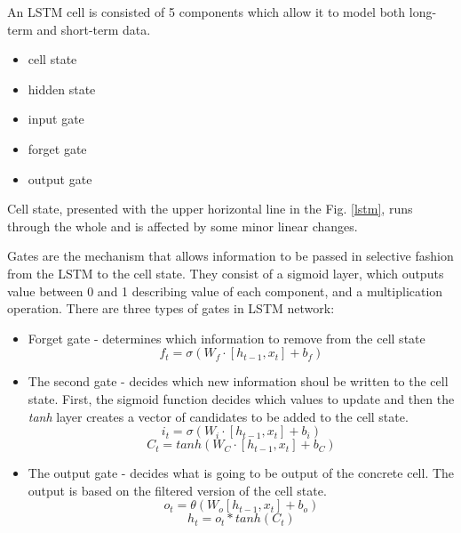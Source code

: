\documentclass[10pt, a4paper]{article} %
\begin{document}
An LSTM cell is consisted of 5 components which allow it to model both long-term and short-term data.
\begin{itemize}
	\item cell state
	\item hidden state
	\item input gate 
	\item forget gate
	\item output gate 
\end{itemize}

Cell state, presented with the upper horizontal line in the Fig. \ref{lstm}, runs through the whole and is affected by some minor linear changes.

Gates are the mechanism that allows information to be passed in selective fashion from the LSTM to the cell state. They consist of a sigmoid layer, which outputs value between 0 and 1 describing value of each component, and a multiplication operation.
There are three types of gates in LSTM network:
\begin{itemize}
	\item {Forget gate} - determines which information to remove from the cell state $$ f_{t} = \sigma (W_{f} \cdot [h_{t-1}, x_{t}] + b_{f}) $$
	\item {The second gate} - decides which new information shoul be written to the cell state. First, the sigmoid function decides which values to update and then the \emph{tanh} layer creates a vector of candidates to be added to the cell state. $$ i_{t} = \sigma (W_{i} \cdot [h_{t-1}, x_{t}] + b_{i}) $$ $$ C_{t} = tanh (W_{C} \cdot [h_{t-1}, x_{t}] + b_{C}) $$
	\item {The output gate} - decides what is going to be output of the concrete cell. The output is based on the filtered version of the cell state. $$ o_{t} = \theta (W_{o} [h_{t-1}, x_{t}] + b_{o}) $$ $$ h_{t} = o_{t} * tanh(C_{t})$$
\end{itemize}

\printbibliography

\end{document}

